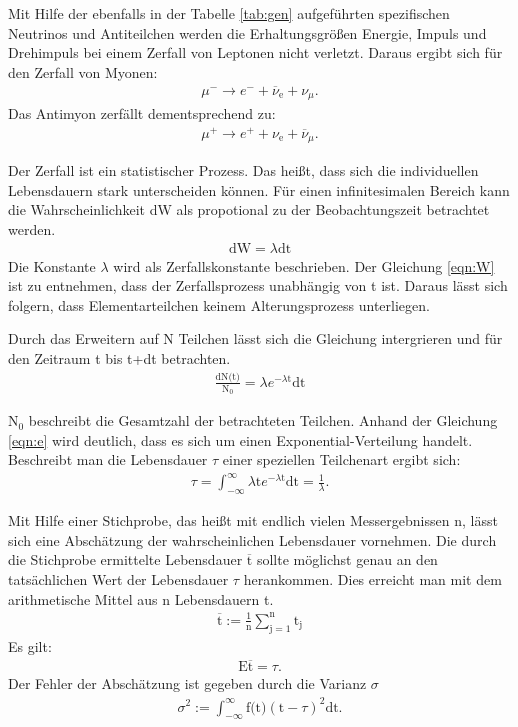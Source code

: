 Mit Hilfe der ebenfalls in der Tabelle \ref{tab:gen} aufgeführten spezifischen Neutrinos und Antiteilchen
werden die Erhaltungsgrößen Energie, Impuls und Drehimpuls bei einem Zerfall von Leptonen nicht verletzt.
Daraus ergibt sich für den Zerfall von Myonen:
\begin{align}
  \mu^{-}\rightarrow e^-+\overline{\nu}_\text{e}+\nu_{\mu}.
  \label{eqn:mu-}
\end{align}
Das Antimyon zerfällt dementsprechend zu:
\begin{align}
  \mu^{+}\rightarrow e^++\nu_\text{e}+\overline{\nu}_{\mu}.
  \label{eqn:mu+}
\end{align}

Der Zerfall ist ein statistischer Prozess. Das heißt, dass sich die individuellen Lebensdauern stark unterscheiden können.
Für einen infinitesimalen Bereich kann die Wahrscheinlichkeit dW als propotional zu der Beobachtungszeit betrachtet werden.
\begin{align}
  \text{dW}=\lambda \text{dt}
  \label{eqn:W}
\end{align}
Die Konstante $\lambda$ wird als Zerfallskonstante beschrieben.
Der Gleichung \ref{eqn:W} ist zu entnehmen, dass der Zerfallsprozess unabhängig von t ist.
Daraus lässt sich folgern, dass Elementarteilchen keinem Alterungsprozess unterliegen.

Durch das Erweitern auf N Teilchen lässt sich die Gleichung intergrieren und für den Zeitraum t bis t+dt betrachten.
\begin{align}
  \frac{\text{dN(t)}}{\text{N}_0}=\lambda e^{-\lambda \text{t}} \text{dt}
  \label{eqn:e}
\end{align}



$\text{N}_0$ beschreibt die Gesamtzahl der betrachteten Teilchen.
Anhand der Gleichung \ref{eqn:e} wird deutlich, dass es sich um einen Exponential-Verteilung handelt.
Beschreibt man die Lebensdauer $\tau$ einer speziellen Teilchenart ergibt sich:
\begin{align*}
  \tau=\int_{-\infty}^{\infty}\lambda \text{t} e^{-\lambda \text{t}}\text{dt}=\frac{1}{\lambda}.
\end{align*}

Mit Hilfe einer Stichprobe, das heißt mit endlich vielen Messergebnissen n, lässt sich eine Abschätzung der wahrscheinlichen Lebensdauer vornehmen.
Die durch die Stichprobe ermittelte Lebensdauer $\overline{\text{t}}$ sollte möglichst genau an den tatsächlichen Wert der Lebensdauer $\tau$ herankommen.
Dies erreicht man mit dem arithmetische Mittel aus n Lebensdauern t.
\begin{align*}
  \overline{\text{t}}:=\frac{1}{\text{n}}\sum_{\text{j}=1}^\text{n}\text{t}_\text{j}
\end{align*}
Es gilt:
\begin{align*}
  \text{E}\overline{\text{t}}=\tau.
\end{align*}
Der Fehler der Abschätzung ist gegeben durch die Varianz $\sigma$
\begin{align*}
  \sigma^2:=\int_{-\infty}^{\infty}\text{f(t)}(\text{t}-\tau)^2\text{dt}.
\end{align*}


